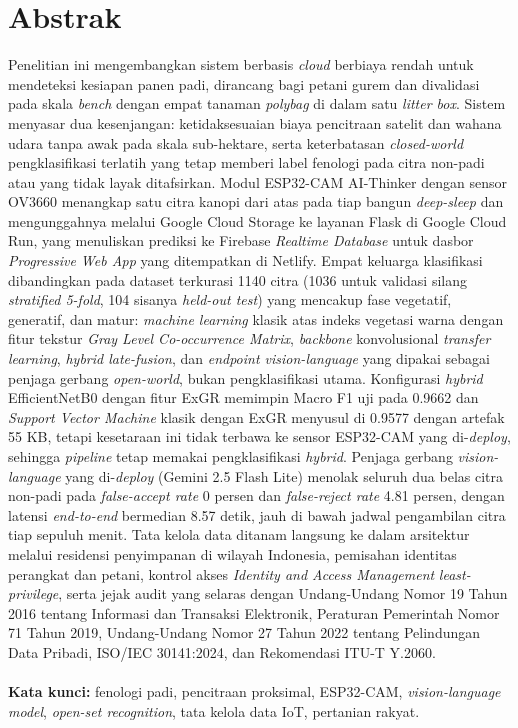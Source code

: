 

\chapter*{Abstrak}

	Penelitian ini mengembangkan sistem berbasis \textit{cloud} berbiaya rendah untuk mendeteksi kesiapan panen padi, dirancang bagi petani gurem dan divalidasi pada skala \textit{bench} dengan empat tanaman \textit{polybag} di dalam satu \textit{litter box}. Sistem menyasar dua kesenjangan: ketidaksesuaian biaya pencitraan satelit dan wahana udara tanpa awak pada skala sub-hektare, serta keterbatasan \textit{closed-world} pengklasifikasi terlatih yang tetap memberi label fenologi pada citra non-padi atau yang tidak layak ditafsirkan. Modul ESP32-CAM AI-Thinker dengan sensor OV3660 menangkap satu citra kanopi dari atas pada tiap bangun \textit{deep-sleep} dan mengunggahnya melalui Google Cloud Storage ke layanan Flask di Google Cloud Run, yang menuliskan prediksi ke Firebase \textit{Realtime Database} untuk dasbor \textit{Progressive Web App} yang ditempatkan di Netlify. Empat keluarga klasifikasi dibandingkan pada dataset terkurasi 1140 citra (1036 untuk validasi silang \textit{stratified 5-fold}, 104 sisanya \textit{held-out test}) yang mencakup fase vegetatif, generatif, dan matur: \textit{machine learning} klasik atas indeks vegetasi warna dengan fitur tekstur \textit{Gray Level Co-occurrence Matrix}, \textit{backbone} konvolusional \textit{transfer learning}, \textit{hybrid late-fusion}, dan \textit{endpoint vision-language} yang dipakai sebagai penjaga gerbang \textit{open-world}, bukan pengklasifikasi utama. Konfigurasi \textit{hybrid} EfficientNetB0 dengan fitur ExGR memimpin Macro F1 uji pada 0.9662 dan \textit{Support Vector Machine} klasik dengan ExGR menyusul di 0.9577 dengan artefak 55 KB, tetapi kesetaraan ini tidak terbawa ke sensor ESP32-CAM yang di-\textit{deploy}, sehingga \textit{pipeline} tetap memakai pengklasifikasi \textit{hybrid}. Penjaga gerbang \textit{vision-language} yang di-\textit{deploy} (Gemini 2.5 Flash Lite) menolak seluruh dua belas citra non-padi pada \textit{false-accept rate} 0 persen dan \textit{false-reject rate} 4.81 persen, dengan latensi \textit{end-to-end} bermedian 8.57 detik, jauh di bawah jadwal pengambilan citra tiap sepuluh menit. Tata kelola data ditanam langsung ke dalam arsitektur melalui residensi penyimpanan di wilayah Indonesia, pemisahan identitas perangkat dan petani, kontrol akses \textit{Identity and Access Management} \textit{least-privilege}, serta jejak audit yang selaras dengan Undang-Undang Nomor 19 Tahun 2016 tentang Informasi dan Transaksi Elektronik, Peraturan Pemerintah Nomor 71 Tahun 2019, Undang-Undang Nomor 27 Tahun 2022 tentang Pelindungan Data Pribadi, ISO/IEC 30141:2024, dan Rekomendasi ITU-T Y.2060.\\
\\
\textbf{Kata kunci:} fenologi padi, pencitraan proksimal, ESP32-CAM, \textit{vision-language model}, \textit{open-set recognition}, tata kelola data IoT, pertanian rakyat.

